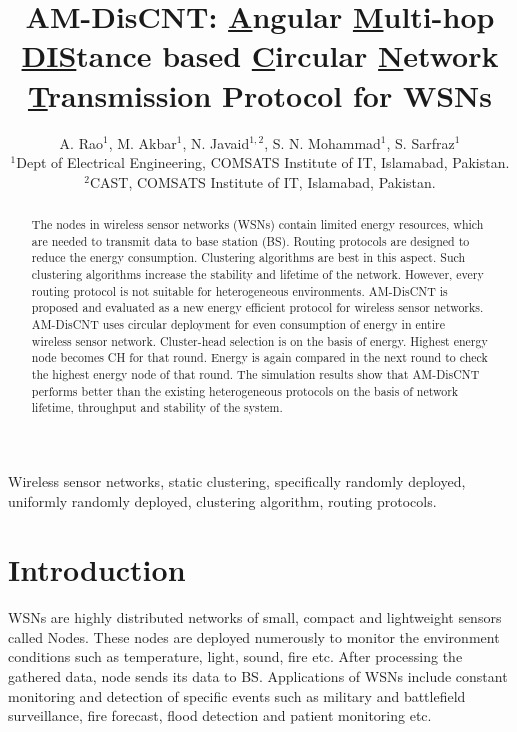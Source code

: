 \documentclass[journal]{IEEEtran}
\begin{document}
\title{AM-DisCNT: \underline{A}ngular \underline{M}ulti-hop \underline{DIS}tance based \underline{C}ircular \underline{N}etwork \underline{T}ransmission Protocol for WSNs}

\author{A. Rao$^{1}$, M. Akbar$^{1}$, N. Javaid$^{1,2}$, S. N. Mohammad$^{1}$, S. Sarfraz$^{1}$\\\vspace{0.4cm}
$^{1}$Dept of Electrical Engineering, COMSATS Institute of IT, Islamabad, Pakistan.\\
$^{2}$CAST, COMSATS Institute of IT, Islamabad, Pakistan.}

\maketitle
\begin{abstract}
 The nodes in wireless sensor networks (WSNs) contain limited energy resources, which are needed to transmit data to base station (BS). Routing protocols are designed to reduce the energy consumption. Clustering algorithms are best in this aspect. Such clustering algorithms increase the stability and lifetime of the network. However, every routing protocol is not suitable for heterogeneous environments. AM-DisCNT is proposed and evaluated as a new energy efficient protocol for wireless sensor networks. AM-DisCNT uses circular deployment for even consumption of energy in entire wireless sensor network. Cluster-head selection is on the basis of energy. Highest energy node becomes CH for that round. Energy is again compared in the next round to check the highest energy node of that round. The simulation results show that AM-DisCNT performs better than the existing heterogeneous protocols on the basis of network lifetime, throughput and stability of the system.
\end{abstract}

\begin{IEEEkeywords}
Wireless sensor networks, static clustering, specifically randomly deployed, uniformly randomly deployed, clustering algorithm, routing protocols.
\end{IEEEkeywords}
\IEEEpeerreviewmaketitle
\section{Introduction}

WSNs are highly distributed networks of small, compact and lightweight sensors called Nodes. These nodes are deployed numerously to monitor the environment conditions such as temperature, light, sound, fire etc. After processing the gathered data, node sends its data to BS. Applications of WSNs include constant monitoring and detection of specific events such as military and battlefield surveillance, fire forecast, flood detection and patient monitoring etc.
\end{document}
